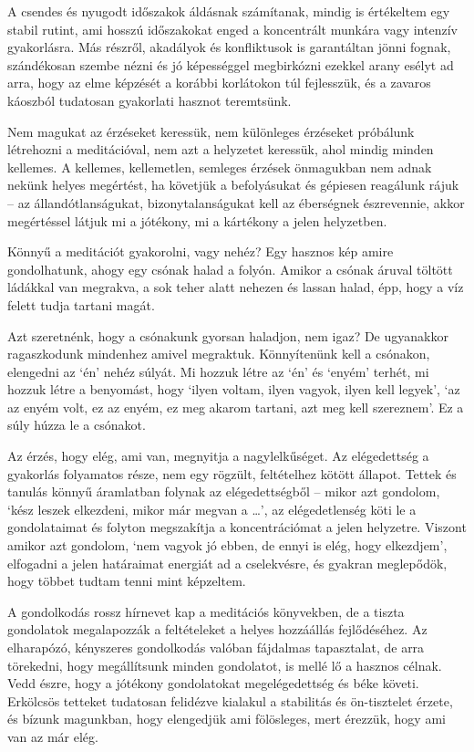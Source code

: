 A csendes és nyugodt időszakok áldásnak számítanak, mindig is értékeltem
egy stabil rutint, ami hosszú időszakokat enged a koncentrált munkára
vagy intenzív gyakorlásra. Más részről, akadályok és konfliktusok is
garantáltan jönni fognak, szándékosan szembe nézni és jó képességgel
megbirkózni ezekkel arany esélyt ad arra, hogy az elme képzését a
korábbi korlátokon túl fejlesszük, és a zavaros káoszból tudatosan
gyakorlati hasznot teremtsünk.

Nem magukat az érzéseket keressük, nem különleges érzéseket próbálunk
létrehozni a meditációval, nem azt a helyzetet keressük, ahol mindig
minden kellemes. A kellemes, kellemetlen, semleges érzések önmagukban
nem adnak nekünk helyes megértést, ha követjük a befolyásukat és
gépiesen reagálunk rájuk -- az állandótlanságukat, bizonytalanságukat
kell az éberségnek észrevennie, akkor megértéssel látjuk mi a jótékony,
mi a kártékony a jelen helyzetben.

Könnyű a meditációt gyakorolni, vagy nehéz? Egy hasznos kép amire
gondolhatunk, ahogy egy csónak halad a folyón. Amikor a csónak áruval
töltött ládákkal van megrakva, a sok teher alatt nehezen és lassan
halad, épp, hogy a víz felett tudja tartani magát.

Azt szeretnénk, hogy a csónakunk gyorsan haladjon, nem igaz? De
ugyanakkor ragaszkodunk mindenhez amivel megraktuk. Könnyítenünk kell a
csónakon, elengedni az `én' nehéz súlyát. Mi hozzuk létre az `én' és
`enyém' terhét, mi hozzuk létre a benyomást, hogy `ilyen voltam, ilyen
vagyok, ilyen kell legyek', `az az enyém volt, ez az enyém, ez meg
akarom tartani, azt meg kell szereznem'. Ez a súly húzza le a csónakot.

Az érzés, hogy elég, ami van, megnyitja a nagylelkűséget. Az
elégedettség a gyakorlás folyamatos része, nem egy rögzült, feltételhez
kötött állapot. Tettek és tanulás könnyű áramlatban folynak az
elégedettségből -- mikor azt gondolom, `kész leszek elkezdeni, mikor már
megvan a \ldots{}', az elégedetlenség köti le a gondolataimat és folyton
megszakítja a koncentrációmat a jelen helyzetre. Viszont amikor azt
gondolom, `nem vagyok jó ebben, de ennyi is elég, hogy elkezdjem',
elfogadni a jelen határaimat energiát ad a cselekvésre, és gyakran
meglepődök, hogy többet tudtam tenni mint képzeltem.

A gondolkodás rossz hírnevet kap a meditációs könyvekben, de a tiszta
gondolatok megalapozzák a feltételeket a helyes hozzáállás fejlődéséhez.
Az elharapózó, kényszeres gondolkodás valóban fájdalmas tapasztalat, de
arra törekedni, hogy megállítsunk minden gondolatot, is mellé lő a
hasznos célnak. Vedd észre, hogy a jótékony gondolatokat megelégedettség
és béke követi. Erkölcsös tetteket tudatosan felidézve kialakul a
stabilitás és ön-tisztelet érzete, és bízunk magunkban, hogy elengedjük
ami fölösleges, mert érezzük, hogy ami van az már elég.

